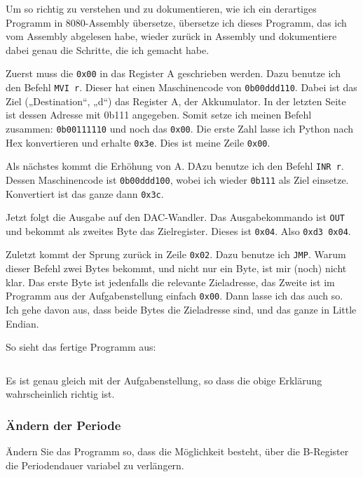 Um so richtig zu verstehen und zu dokumentieren, wie ich ein derartiges
Programm in 8080-Assembly übersetze, übersetze ich dieses Programm, das ich vom
Assembly abgelesen habe, wieder zurück in Assembly und dokumentiere dabei genau
die Schritte, die ich gemacht habe.

Zuerst muss die \texttt{0x00} in das Register A geschrieben werden. Dazu
benutze ich den Befehl \texttt{MVI~r}. Dieser hat einen Maschinencode von
\texttt{0b00ddd110}. Dabei ist das Ziel („Destination“, „d“) das Register A, der
Akkumulator. In der letzten Seite ist dessen Adresse mit 0b111 angegeben. Somit
setze ich meinen Befehl zusammen: \texttt{0b00111110} und noch das \texttt{0x00}.
Die erste Zahl lasse ich Python nach Hex konvertieren und erhalte
\texttt{0x3e}. Dies ist meine Zeile \texttt{0x00}.

Als nächstes kommt die Erhöhung von A. DAzu benutze ich den Befehl
\texttt{INR~r}. Dessen Maschinencode ist \texttt{0b00ddd100}, wobei ich wieder
\texttt{0b111} als Ziel einsetze. Konvertiert ist das ganze dann \texttt{0x3c}.

Jetzt folgt die Ausgabe auf den DAC-Wandler. Das Ausgabekommando ist
\texttt{OUT} und bekommt als zweites Byte das Zielregister. Dieses ist
\texttt{0x04}. Also \texttt{0xd3~0x04}.

Zuletzt kommt der Sprung zurück in Zeile \texttt{0x02}. Dazu benutze ich
\texttt{JMP}. Warum dieser Befehl zwei Bytes bekommt, und nicht nur ein Byte,
ist mir (noch) nicht klar. Das erste Byte ist jedenfalls die relevante
Zieladresse, das Zweite ist im Programm aus der Aufgabenstellung einfach
\texttt{0x00}. Dann lasse ich das auch so. Ich gehe davon aus, dass beide Bytes
die Zieladresse sind, und das ganze in Little Endian.

So sieht das fertige Programm aus:

\inputminted[fontsize=\small, linenos]{text}{../Assembly/a.s}

Es ist genau gleich mit der Aufgabenstellung, so dass die obige Erklärung
wahrscheinlich richtig ist.

\subsubsection{Ändern der Periode}

\begin{problem}
	Ändern Sie das Programm so, dass die Möglichkeit besteht, über die
	B-Register die Periodendauer variabel zu verlängern.
\end{problem}

